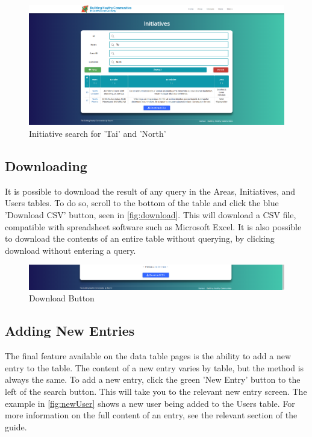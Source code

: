 \documentclass{bhcguides}
\begin{document}
\begin{figure}[h!]
 \centerline{\includegraphics[width=\textwidth, height=\textheight, keepaspectratio]{initsearch.png}}
 \caption{Initiative search for 'Tai' and 'North'}
 \label{fig:initSearch}
\end{figure}

\subsection{Downloading}
\label{ssec:download}

It is possible to download the result of any query in the Areas, Initiatives, and Users tables. To do so, scroll to the bottom of the table and click the blue 'Download CSV' button, seen in \autoref{fig:download}. This will download a CSV file, compatible with spreadsheet software such as Microsoft Excel. It is also possible to download the contents of an entire table without querying, by clicking download without entering a query.

\begin{figure}[h!]
 \centerline{\includegraphics[width=\textwidth, height=\textheight, keepaspectratio]{downloadbutton.png}}
 \caption{Download Button}
 \label{fig:download}
\end{figure}

\subsection{Adding New Entries}
\label{ssec:addentries}

The final feature available on the data table pages is the ability to add a new entry to the table. The content of a new entry varies by table, but the method is always the same. To add a new entry, click the green 'New Entry' button to the left of the search button. This will take you to the relevant new entry screen. The example in \autoref{fig:newUser} shows a new user being added to the Users table. For more information on the full content of an entry, see the relevant section of the guide.
\end{document}
